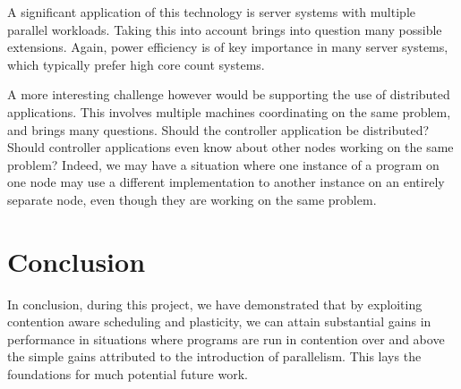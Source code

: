 A significant application of this technology is server systems with multiple parallel workloads. Taking this into account brings into question many possible extensions. Again, power efficiency is of key importance in many server systems, which typically prefer high core count systems. 

A more interesting challenge however would be supporting the use of distributed applications. This involves multiple machines coordinating on the same problem, and brings many questions. Should the controller application be distributed? Should controller applications even know about other nodes working on the same problem? Indeed, we may have a situation where one instance of a program on one node may use a different implementation to another instance on an entirely separate node, even though they are working on the same problem.



\section{Conclusion}

In conclusion, during this project, we have demonstrated that by exploiting contention aware scheduling and plasticity, we can attain substantial gains in performance in situations where programs are run in contention over and above the simple gains attributed to the introduction of parallelism. This lays the foundations for much potential future work.